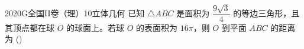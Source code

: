 
\begin{problem}{2020}{G}{全国II卷（理）}{10}{立体几何}
已知 $ \triangle ABC $ 是面积为 $ \dfrac{9\sqrt{3}}{4} $ 的等边三角形，且其顶点都在球 $ O $ 的球面上。若球 $ O $ 的表面积为 $ 16\pi $，则 $ O $ 到平面 $ ABC $ 的距离为 (\hspace{1cm})
\begin{choices}
\end{choices}
\end{problem}

\begin{answer}

\end{answer}

\begin{solutions}

\end{solutions}